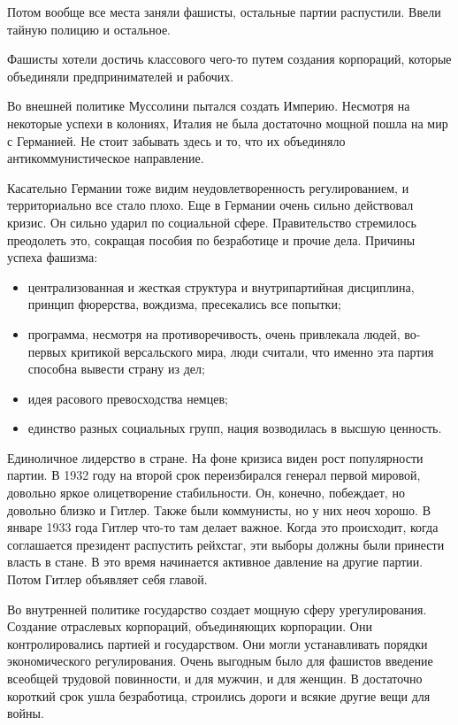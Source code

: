 \documentclass[a4paper, 12pt]{article}
\begin{document}
\begin{multicols}{2}
Потом вообще все места заняли фашисты, остальные партии распустили. Ввели тайную полицию и остальное. 

Фашисты хотели достичь классового чего-то путем создания корпораций, которые объединяли предпринимателей и рабочих. 

Во внешней политике Муссолини пытался создать Империю. Несмотря на некоторые успехи в колониях, Италия не была достаточно мощной пошла на мир с Германией. Не стоит забывать здесь и то, что их объединяло антикоммунистическое направление. 

Касательно Германии тоже видим неудовлетворенность регулированием, и территориально все стало плохо. Еще в Германии очень сильно действовал кризис. Он сильно ударил по социальной сфере. Правительство стремилось преодолеть это, сокращая пособия по безработице и прочие дела. Причины успеха фашизма: 
\begin{itemize}
\item централизованная и жесткая структура и внутрипартийная дисциплина, принцип фюрерства, вождизма, пресекались все попытки; 
\item программа, несмотря на противоречивость, очень привлекала людей, во-первых критикой версальского мира, люди считали, что именно эта партия способна вывести страну из дел; 
\item идея расового превосходства немцев; 
\item единство разных социальных групп, нация возводилась в высшую ценность.
\end{itemize}

Единоличное лидерство в стране. На фоне кризиса виден рост популярности партии. В 1932 году на второй срок переизбирался генерал первой мировой, довольно яркое олицетворение стабильности. Он, конечно, побеждает, но довольно близко и Гитлер. Также были коммунисты, но у них неоч хорошо. В январе 1933 года Гитлер что-то там делает важное. Когда это происходит, когда соглашается президент распустить рейхстаг, эти выборы  должны были принести власть в стане. В это время начинается активное давление на другие партии. 
Потом Гитлер объявляет себя главой. 

Во внутренней политике государство создает мощную сферу урегулирования. Создание отраслевых корпораций, объединяющих корпорации. Они контролировались партией и государством. Они могли устанавливать порядки экономического регулирования. Очень выгодным было для фашистов введение всеобщей трудовой повинности, и для мужчин, и для женщин. В достаточно короткий срок ушла безработица, строились дороги и всякие другие вещи для войны. 


\end{multicols}
\end{document}

